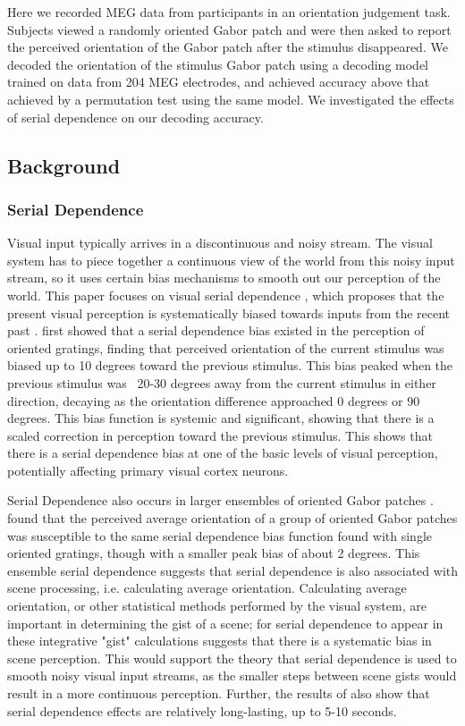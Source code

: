 \documentclass[../main.tex]{subfiles}
\begin{document}
Here we recorded MEG data from participants in an orientation judgement task. Subjects viewed a randomly oriented Gabor patch and were then asked to report the perceived orientation of the Gabor patch after the stimulus disappeared. We decoded the orientation of the stimulus Gabor patch using a decoding model trained on data from 204 MEG electrodes, and achieved accuracy above that achieved by a permutation test using the same model. We investigated the effects of serial dependence on our decoding accuracy.



\subsection{Background}
\subsubsection{Serial Dependence}
Visual input typically arrives in a discontinuous and noisy stream. The visual system has to piece together a continuous view of the world from this noisy input stream, so it uses certain bias mechanisms to smooth out our perception of the world. This paper focuses on visual serial dependence , which proposes that the present visual perception is systematically biased towards inputs from the recent past \citep{fischer_whitney_2014}. \cite{fischer_whitney_2014} first showed that a serial dependence bias existed in the perception of oriented gratings, finding that perceived orientation of the current stimulus was biased up to 10 degrees toward the previous stimulus. This bias peaked when the previous stimulus was ~20-30 degrees away from the current stimulus in either direction, decaying as the orientation difference approached 0 degrees or 90 degrees. This bias function is systemic and significant, showing that there is a scaled correction in perception toward the previous stimulus. This shows that there is a serial dependence bias at one of the basic levels of visual perception, potentially affecting primary visual cortex neurons.

Serial Dependence also occurs in larger ensembles of oriented Gabor patches \citep{Manassi}. \cite{Manassi} found that the perceived average orientation of a group of oriented Gabor patches was susceptible to the same serial dependence bias function found with single oriented gratings, though with a smaller peak bias of about 2 degrees. This ensemble serial dependence suggests that serial dependence is also associated with scene processing, i.e. calculating average orientation. Calculating average orientation, or other statistical methods performed by the visual system, are important in determining the gist of a scene; for serial dependence to appear in these integrative "gist" calculations suggests that there is a systematic bias in scene perception. This would support the theory that serial dependence is used to smooth noisy visual input streams, as the smaller steps between scene gists would result in a more continuous perception. Further, the results of \cite{Manassi} also show that serial dependence effects are relatively long-lasting, up to 5-10 seconds. 
\end{document}
